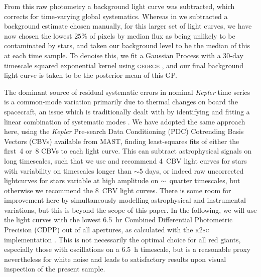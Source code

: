 \documentclass[a4paper,fleqn,usenatbib]{mnras}
\newcommand{\kepler}{\emph{Kepler}\xspace}
\begin{document}
From this raw photometry a background light curve was subtracted, which corrects for time-varying global systematics. Whereas in \citet{smear} we subtracted a background estimate chosen manually, for this larger set of light curves, we have now chosen the lowest $25\%$ of pixels by median flux as being unlikely to be contaminated by stars, and taken our background level to be the median of this at each time sample. To denoise this, we fit a Gaussian Process with a 30-day timescale squared exponential kernel using \textsc{george} \citep{hodlr}, and our final background light curve is taken to be the posterior mean of this GP. 

The dominant source of residual systematic errors in nominal \kepler time series is a common-mode variation primarily due to thermal changes on board the spacecraft, an issue which is traditionally dealt with by identifying and fitting a linear combination of systematic modes \citep{pdc0,pdc1,pdc2,petigura}. We have adopted the same approach here, using the \kepler Pre-search Data Conditioning (PDC) Cotrending Basis Vectors (CBVs) available from MAST, finding least-squares fits of either the first~4 or~8 CBVs to each light curve. This can subtract astrophysical signals on long timescales, such that we use and recommend 4~CBV light curves for stars with variability on timescales longer than $\sim 5$ days, or indeed raw uncorrected lightcurves for stars variable at high amplitude on $\sim$~quarter timescales, but otherwise we recommend the 8~CBV light curves. There is some room for improvement here by simultaneously modelling astrophysical and instrumental variations, but this is beyond the scope of this paper. In the following, we will use the light curves with the lowest 6.5~hr Combined Differential Photometric Precision (CDPP) \citep{cdpp} out of all apertures, as calculated with the \textsc{k2sc} implementation \citep{k2sc}. This is not necessarily the optimal choice for all red giants, especially those with oscillations on a 6.5~h timescale, but is a reasonable proxy nevertheless for white noise and leads to satisfactory results upon visual inspection of the present sample.
\end{document}

